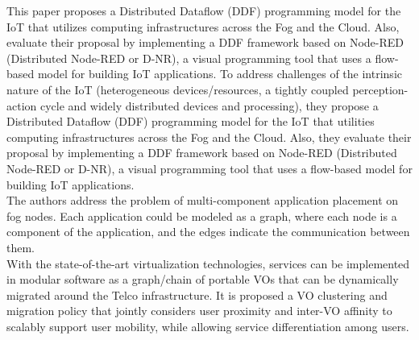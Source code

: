 \cite{giang2015developing}
This paper proposes a Distributed Dataflow (DDF) programming model for the IoT that utilizes computing infrastructures across the Fog and the Cloud. Also, evaluate their proposal by implementing a DDF framework based on Node-RED (Distributed Node-RED or D-NR), a visual programming tool that uses a flow-based model for building IoT applications. To address challenges of the intrinsic nature of the IoT (heterogeneous devices/resources, a tightly coupled perception-action cycle and widely distributed devices and processing), they propose a Distributed Dataflow (DDF) programming model for the IoT that utilities computing infrastructures across the Fog and the Cloud. Also, they evaluate their proposal by implementing a DDF framework based on Node-RED (Distributed Node-RED or D-NR), a visual programming tool that uses a flow-based model for building IoT applications.\\

\cite{bahreini2017efficient}
The authors address the problem of multi-component application placement on fog nodes. Each application could be modeled as a graph, where each node is a component of the application, and the edges indicate the communication between them.\\


\cite{bruschi2018move}
With the state-of-the-art virtualization technologies, services can be implemented in modular software as a graph/chain of portable VOs that can be dynamically migrated around the Telco infrastructure. It is proposed a VO clustering and migration policy that jointly considers user proximity and inter-VO affinity to scalably support user mobility, while allowing service differentiation among users.




\vfill\pagebreak
